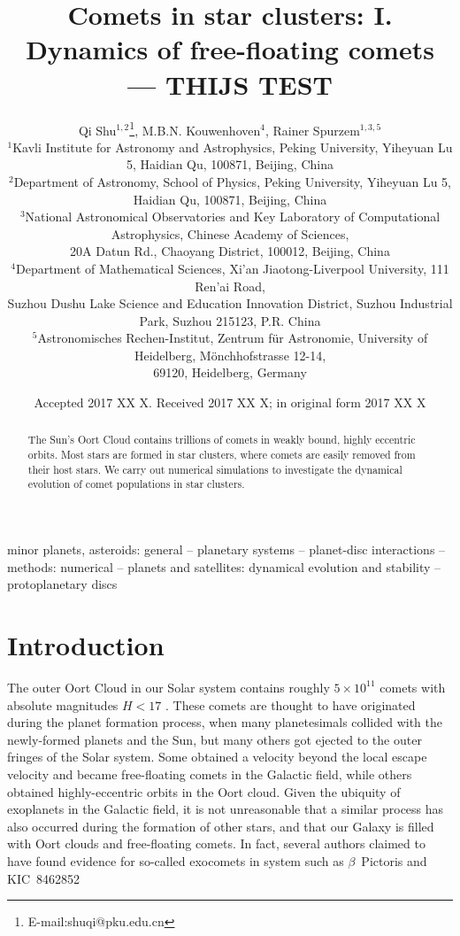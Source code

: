 \documentclass[usenatbib]{mnras}
\title[Comets in star clusters: I. Dynamics of free-floating comets]{Comets in star clusters: I. Dynamics of free-floating comets --- THIJS TEST}
\author[Qi Shu et al.]{Qi Shu$^{1,2}$\thanks{E-mail:shuqi@pku.edu.cn}, M.B.N. Kouwenhoven$^{4}$, Rainer Spurzem$^{1,3,5}$\\
  $^{1}$Kavli Institute for Astronomy and Astrophysics, Peking University, Yiheyuan Lu 5, Haidian Qu, 100871, Beijing, China\\
  $^{2}$Department of Astronomy, School of Physics, Peking University, Yiheyuan Lu 5, Haidian Qu, 100871, Beijing, China\\
  $^{3}$National Astronomical Observatories and Key Laboratory of Computational Astrophysics, Chinese Academy of Sciences, \\
  20A Datun Rd., Chaoyang District, 100012, Beijing, China\\ 
  $^{4}$Department of Mathematical Sciences, Xi'an Jiaotong-Liverpool University, 111 Ren'ai Road, \\
  Suzhou Dushu Lake Science and Education Innovation District, Suzhou Industrial Park, Suzhou 215123, P.R. China \\
  $^{5}$Astronomisches Rechen-Institut, Zentrum f\"ur Astronomie, University of Heidelberg, M\"onchhofstrasse 12-14, \\
69120, Heidelberg, Germany \\
}
\begin{document}
\date{Accepted 2017 XX X. Received 2017 XX X; in original form 2017 XX X}

  

\maketitle

\label{firstpage}

\begin{abstract}
The Sun's Oort Cloud contains trillions of comets in weakly bound, highly eccentric orbits. Most stars are formed in star clusters, where comets are easily removed from their host stars. We carry out numerical simulations to investigate the dynamical evolution of comet populations in star clusters.


\end{abstract}

\begin{keywords}
minor planets, asteroids: general -- planetary systems -- planet-disc interactions -- methods: numerical -- planets and satellites: dynamical evolution and stability -- protoplanetary discs
\end{keywords}

\section{Introduction}

The outer Oort Cloud in our Solar system contains roughly $5 \times10^{11}$ comets with absolute magnitudes $H < 17$ \citep{Francis:2005aa}. These comets are thought to have originated during the planet formation process, when many planetesimals collided with the newly-formed planets and the Sun, but many others got ejected to the outer fringes of the Solar system. Some obtained a velocity beyond the local escape velocity and became free-floating comets in the Galactic field, while others obtained highly-eccentric orbits in the Oort cloud. Given the ubiquity of exoplanets in the Galactic field, it is not unreasonable that a similar process has also occurred during the formation of other stars, and that our Galaxy is filled with Oort clouds and free-floating comets. In fact, several authors claimed to have found evidence for so-called exocomets in system such as $\beta$~Pictoris \citep[e.g.,][and references therein]{Welsh:2016aa} and KIC~8462852 \citep[e.g.,][and references therein]{Bodman:2016aa, Boyajian:2016aa}
\end{document}
